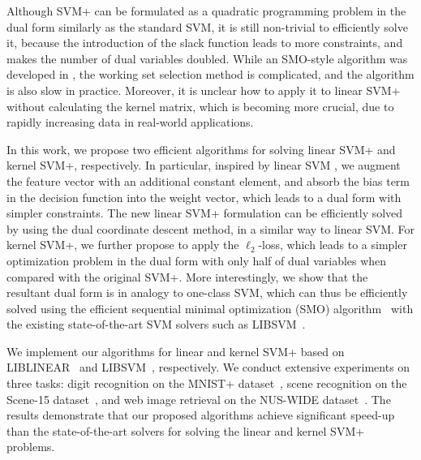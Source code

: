 

Although SVM+ can be formulated as a quadratic programming problem in
the dual form similarly as the standard SVM, it is still non-trivial
to efficiently solve it, because the introduction of the slack
function leads to more constraints, and makes the number of dual
variables doubled. While an SMO-style algorithm was developed in
\citep{Pechyony2010}, the working set selection method is complicated,
and the algorithm is also slow in practice. Moreover, it is unclear
how to apply it to linear SVM+ without calculating the kernel matrix,
which is becoming more crucial, due to rapidly increasing data in
real-world applications.

In this work, we propose two efficient algorithms for solving linear
SVM+ and kernel SVM+, respectively. In particular, inspired by linear
SVM \citep{DCD_linearsvm}, we augment the feature vector with an
additional constant element, and absorb the bias term in the decision
function into the weight vector, which leads to a dual form with
simpler constraints. The new linear SVM+ formulation can be
efficiently solved by using the dual coordinate descent method, in a
similar way to linear SVM. For kernel SVM+, we further propose to
apply the $\ell_2$-loss, which leads to a simpler optimization problem
in the dual form with only half of dual variables when compared with
the original SVM+. More interestingly, we show that the resultant dual
form is in analogy to one-class SVM, which can thus be efficiently
solved using the efficient sequential minimal optimization (SMO)
algorithm~\citep{Platt98sequentialminimal} with the existing
state-of-the-art SVM solvers such as
LIBSVM~\citep{svm_workingset,libsvm}.

We implement our algorithms for linear and kernel SVM+ based on
LIBLINEAR~\citep{liblinear} and LIBSVM~\citep{libsvm}, respectively. We
conduct extensive experiments on three tasks: digit recognition on the
MNIST+ dataset~\citep{SVMplus_vapnik}, scene recognition on the
Scene-15 dataset~\citep{scene-15}, and web image retrieval on the
NUS-WIDE dataset~\citep{NUSWIDE}. The results demonstrate that our
proposed algorithms achieve significant speed-up than the
state-of-the-art solvers for solving the linear and kernel SVM+
problems.


